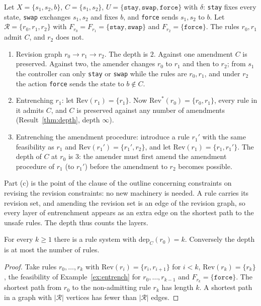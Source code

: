 \begin{example}\label{ex:entrench}
Let $X=\{s_1,s_2,b\}$, $C=\{s_1,s_2\}$, $U=\{\texttt{stay},\texttt{swap},\texttt{force}\}$ with $\delta$: \texttt{stay} fixes every state, \texttt{swap} exchanges $s_1,s_2$ and fixes $b$, and \texttt{force} sends $s_1,s_2$ to $b$. Let $\mathcal R=\{r_0,r_1,r_2\}$ with $F_{r_0}=F_{r_1}=\{\texttt{stay},\texttt{swap}\}$ and $F_{r_2}=\{\texttt{force}\}$. The rules $r_0,r_1$ admit $C$, and $r_2$ does not.
\begin{enumerate}[nosep,label=(\alph*)]
  \item Revision graph $r_0\to r_1\to r_2$. The depth is $2$. Against one amendment $C$ is preserved. Against two, the amender changes $r_0$ to $r_1$ and then to $r_2$; from $s_1$ the controller can only \texttt{stay} or \texttt{swap} while the rules are $r_0,r_1$, and under $r_2$ the action \texttt{force} sends the state to $b\notin C$.
  \item Entrenching $r_1$: let $\mathrm{Rev}(r_1)=\{r_1\}$. Now $\mathrm{Rev}^{*}(r_0)=\{r_0,r_1\}$, every rule in it admits $C$, and $C$ is preserved against any number of amendments (Result~\ref{thm:depth}, depth $\infty$).
  \item Entrenching the amendment procedure: introduce a rule $r_1'$ with the same feasibility as $r_1$ and $\mathrm{Rev}(r_1')=\{r_1',r_2\}$, and let $\mathrm{Rev}(r_1)=\{r_1,r_1'\}$. The depth of $C$ at $r_0$ is $3$: the amender must first amend the amendment procedure of $r_1$ (to $r_1'$) before the amendment to $r_2$ becomes possible.
\end{enumerate}
\end{example}

Part (c) is the point of the clause of the outline concerning constraints on revising the revision constraints: no new machinery is needed. A rule carries its revision set, and amending the revision set is an edge of the revision graph, so every layer of entrenchment appears as an extra edge on the shortest path to the unsafe rules. The depth thus counts the layers.

\begin{newresult}\label{prop:arbitrary-depth}
For every $k\ge1$ there is a rule system with $\mathrm{dep}_C(r_0)=k$. Conversely the depth is at most the number of rules.
\end{newresult}
\begin{proof}
Take rules $r_0,\dots,r_k$ with $\mathrm{Rev}(r_i)=\{r_i,r_{i+1}\}$ for $i<k$, $\mathrm{Rev}(r_k)=\{r_k\}$, the feasibility of Example~\ref{ex:entrench} for $r_0,\dots,r_{k-1}$ and $F_{r_k}=\{\texttt{force}\}$. The shortest path from $r_0$ to the non-admitting rule $r_k$ has length $k$. A shortest path in a graph with $|\mathcal R|$ vertices has fewer than $|\mathcal R|$ edges.
\end{proof}


